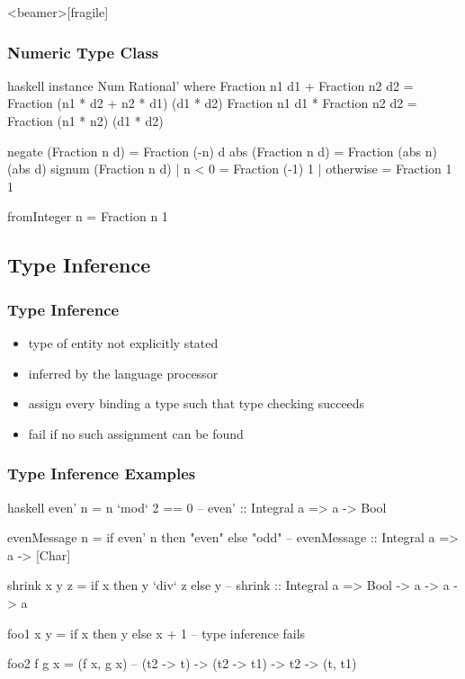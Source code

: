 \documentclass[dvipsnames]{beamer}
\theoremstyle{plain}
\begin{document}
\begin{frame}<beamer>[fragile]
  \frametitle{Numeric Type Class}

  \begin{exampleblock}{}
    \begin{pygments}{haskell}
instance Num Rational' where
  Fraction n1 d1 + Fraction n2 d2 =
      Fraction (n1 * d2 + n2 * d1) (d1 * d2)
  Fraction n1 d1 * Fraction n2 d2 =
      Fraction (n1 * n2) (d1 * d2)

  negate (Fraction n d) = Fraction (-n) d
  abs (Fraction n d)    = Fraction (abs n) (abs d)
  signum (Fraction n d)
    | n < 0     = Fraction (-1) 1
    | otherwise = Fraction 1 1

  fromInteger n = Fraction n 1
    \end{pygments}
  \end{exampleblock}
\end{frame}

\subsection{Type Inference}

\begin{frame}
  \frametitle{Type Inference}

  \begin{itemize}
    \item type of entity not explicitly stated
    \item inferred by the language processor

    \pause
    \medskip
    \item assign every binding a type such that type checking succeeds
    \item fail if no such assignment can be found
  \end{itemize}
\end{frame}

\begin{frame}[fragile]
  \frametitle{Type Inference Examples}

  \begin{exampleblock}{}
    \begin{pygments}{haskell}
even' n = n `mod` 2 == 0
-- even' :: Integral a => a -> Bool

evenMessage n = if even' n then "even" else "odd"
-- evenMessage :: Integral a => a  -> [Char]

shrink x y z = if x then y `div` z else y
-- shrink :: Integral a => Bool -> a -> a -> a

foo1 x y = if x then y else x + 1
-- type inference fails

foo2 f g x = (f x, g x)
-- (t2 -> t) -> (t2 -> t1) -> t2 -> (t, t1)
    \end{pygments}
  \end{exampleblock}
\end{frame}
\end{document}
